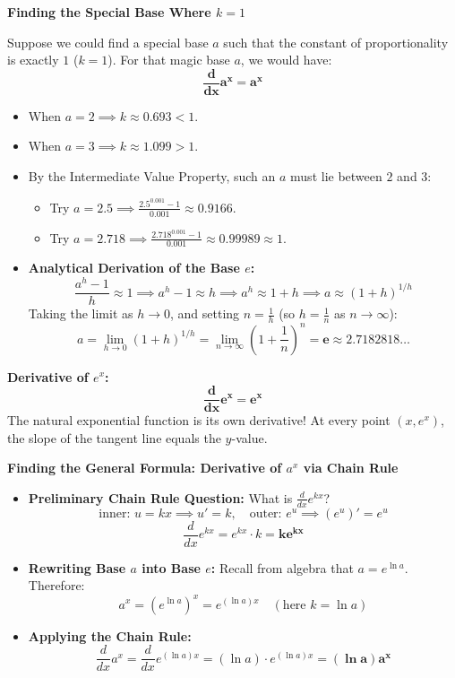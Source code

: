 \documentclass[10.5pt]{article}
\begin{document}
\vspace{0.02in}

\textbf{\large Finding the Special Base Where $k = 1$}

Suppose we could find a special base $a$ such that the constant of proportionality is exactly $1$ ($k = 1$). For that magic base $a$, we would have:
\[
  \mathbf{\frac{d}{dx} a^x = a^x}
\]
\begin{itemize}[leftmargin=1.2em, label=$\bullet$, topsep=1pt, itemsep=2pt]
  \item When $a = 2 \implies k \approx 0.693 < 1$.
  \item When $a = 3 \implies k \approx 1.099 > 1$.
  \item By the Intermediate Value Property, such an $a$ must lie between $2$ and $3$:
  \begin{itemize}[label=--]
    \item Try $a = 2.5 \implies \frac{2.5^{0.001} - 1}{0.001} \approx 0.9166$.
    \item Try $a = 2.718 \implies \frac{2.718^{0.001} - 1}{0.001} \approx 0.99989 \approx 1$.
  \end{itemize}
  \item \textbf{Analytical Derivation of the Base $e$:}
  \[
    \frac{a^h - 1}{h} \approx 1 \implies a^h - 1 \approx h \implies a^h \approx 1 + h \implies a \approx (1 + h)^{1/h}
  \]
  Taking the limit as $h \to 0$, and setting $n = \frac{1}{h}$ (so $h = \frac{1}{n}$ as $n \to \infty$):
  \[
    a = \lim_{h \to 0} (1 + h)^{1/h} = \lim_{n \to \infty} \left(1 + \frac{1}{n}\right)^n = \mathbf{e} \approx 2.7182818\dots
  \]
\end{itemize}

\begin{tcolorbox}[colback=chalkblue!6, colframe=chalkblue, boxrule=1pt, arc=3pt, left=8pt, right=8pt, top=5pt, bottom=5pt]
\textbf{\large Derivative of $e^x$:}
\[
  \mathbf{\frac{d}{dx} e^x = e^x}
\]
The natural exponential function is its own derivative! At every point $(x, e^x)$, the slope of the tangent line equals the $y$-value.
\end{tcolorbox}

\vspace{0.04in}

\textbf{\large Finding the General Formula: Derivative of $a^x$ via Chain Rule}

\begin{itemize}[leftmargin=1.2em, topsep=1pt, itemsep=2pt]
  \item \textbf{Preliminary Chain Rule Question:} What is $\frac{d}{dx} e^{kx}$?
  \[
    \text{inner: } u = kx \implies u' = k, \quad \text{outer: } e^u \implies (e^u)' = e^u
  \]
  \[
    \frac{d}{dx} e^{kx} = e^{kx} \cdot k = \mathbf{k e^{kx}}
  \]
  \item \textbf{Rewriting Base $a$ into Base $e$:}
  Recall from algebra that $a = e^{\ln a}$. Therefore:
  \[
    a^x = (e^{\ln a})^x = e^{(\ln a)x} \quad (\text{here } k = \ln a)
  \]
  \item \textbf{Applying the Chain Rule:}
  \[
    \frac{d}{dx} a^x = \frac{d}{dx} e^{(\ln a)x} = (\ln a) \cdot e^{(\ln a)x} = \mathbf{(\ln a) a^x}
  \]
\end{itemize}
\end{document}
